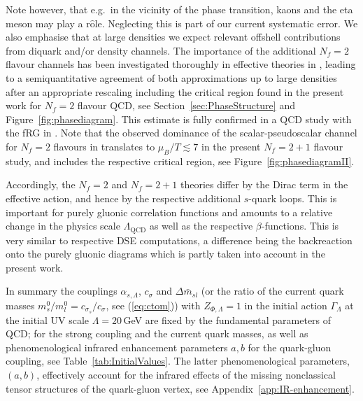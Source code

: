 \documentclass[%
reprint,
superscriptaddress,
showpacs,preprintnumbers,
 amsmath,amssymb,
 aps,
prd,
]{revtex4-1}
\def\eq#1{(\ref{#1})}
\def\fig#1{Figure~\ref{#1}}
\def\sec#1{Section~\ref{#1}}
\def\app#1{Appendix~\ref{#1}}
\begin{document}
%
Note however, that e.g.\ in the vicinity of the phase transition,
kaons and the eta meson may play a r$\hat{\textrm{o}}$le. Neglecting
this is part of our current systematic error. We also emphasise that
at large densities we expect relevant offshell contributions from
diquark and/or density channels.  The importance of the additional
$N_f=2$ flavour channels has been investigated thoroughly in effective
theories in \cite{Braun:2017srn, Braun:2018bik, Zhang:2017icm},
leading to a semiquantitative agreement of both approximations up to
large densities after an appropriate rescaling including the critical
region found in the present work for $N_f=2$ flavour QCD, see
\sec{sec:PhaseStructure} and \fig{fig:phasediagram}. This estimate is
fully confirmed in a QCD study with the fRG in
\cite{Braun:2019a}. Note that the observed dominance of the
scalar-pseudoscalar channel for $N_f=2 $ flavours in
\cite{Braun:2017srn, Braun:2018bik, Braun:2019a} translates to
$\mu_B/T\lesssim 7$ in the present $N_f=2+1$ flavour study, and
includes the respective critical region, see \fig{fig:phasediagramII}. 


Accordingly, the $N_f =2$ and $N_f =2+1$
theories differ by the Dirac term in the effective action, and hence
by the respective additional $s$-quark loops. This is important for
purely gluonic correlation functions and amounts to a relative change
in the physics scale $\Lambda_\textrm{QCD}$ as well as the respective
$\beta$-functions. This is very similar to respective DSE
computations, a difference being the backreaction onto the purely
gluonic diagrams which is partly taken into account in the present
work.

In summary the couplings $\alpha_{s,\Lambda}$, $c_\sigma$ and
$\Delta \bar m_{sl}$ (or the ratio of the current quark masses
$m_s^0/m_l^0=c_{\sigma_s}/c_\sigma$, see \eq{eq:ctom}) with
$Z_{\Phi,\Lambda}=1$ in the initial action $\Gamma_\Lambda$ at the
initial UV scale $\Lambda=20$\,GeV are fixed by the fundamental
parameters of QCD; for the strong coupling and the current quark
masses, as well as phenomenological infrared enhancement parameters
$a,b$ for the quark-gluon coupling, see
Table~\ref{tab:InitialValues}. The latter phenomenological parameters,
$(a,b)$, effectively account for the infrared effects of the missing
nonclassical tensor structures of the quark-gluon vertex, see
\app{app:IR-enhancement}.
\end{document}

